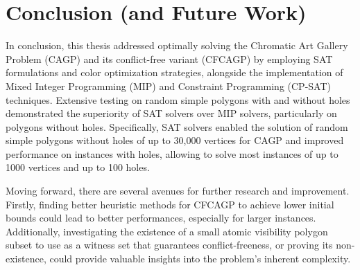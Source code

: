 \chapter{Conclusion (and Future Work)}

In conclusion, this thesis addressed optimally solving the Chromatic Art Gallery Problem (CAGP) and its conflict-free variant (CFCAGP) by employing SAT formulations and color optimization strategies, alongside the implementation of Mixed Integer Programming (MIP) and Constraint Programming (CP-SAT) techniques. Extensive testing on random simple polygons with and without holes demonstrated the superiority of SAT solvers over MIP solvers, particularly on polygons without holes. Specifically, SAT solvers enabled the solution of random simple polygons without holes of up to 30,000 vertices for CAGP and improved performance on instances with holes, allowing to solve most instances of up to 1000 vertices and up to 100 holes.

Moving forward, there are several avenues for further research and improvement. Firstly, finding better heuristic methods for CFCAGP to achieve lower initial bounds could lead to better performances, especially for larger instances. Additionally, investigating the existence of a small atomic visibility polygon subset to use as a witness set that guarantees conflict-freeness, or proving its non-existence, could provide valuable insights into the problem's inherent complexity.





